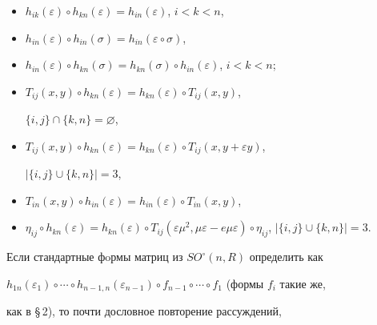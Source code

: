 \begin{itemize} 


\item[$\bold 1$. a)] $h_{ik}(\varepsilon)\circ 


h_{kn}(\varepsilon)=h_{in}(\varepsilon)$, $i<k<n$, 


\item[\phantom{$\bold 1$.} b)] $h_{in}(\varepsilon)\circ 


h_{in}(\sigma)=h_{in}(\varepsilon\circ\sigma)$, 


\item[\phantom{$\bold 1$.} c)] $h_{in}(\varepsilon)\circ 


h_{kn}(\sigma)=h_{kn}(\sigma)\circ h_{in}(\varepsilon)$, $i<k<n$; 


%


\item[$\bold 2$. a)] $T_{ij}(x,y)\circ 


h_{kn}(\varepsilon)=h_{kn}(\varepsilon)\circ T_{ij}(x,y)$, 


$\{i,j\}\cap\{k,n\}=\varnothing$, 


\item[\phantom{$\bold 1$.} b)] $T_{ij}(x,y)\circ h_{kn}(\varepsilon)= 


h_{kn}(\varepsilon)\circ T_{ij}(x,y+\varepsilon y)$, 


$|\{i,j\}\cup\{k,n\}|=3$, 


\item[\phantom{$\bold 1$.} c)] $T_{in}(x,y)\circ h_{in}(\varepsilon)= 


h_{in}(\varepsilon)\circ T_{in}(x,y)$, 


\item[\phantom{$\bold 1$.} d)] $\eta_{ij}\circ h_{kn}(\varepsilon)= 


h_{kn}(\varepsilon)\circ T_{ij}(\varepsilon\mu^2,\mu\varepsilon- 


e\mu\varepsilon)\circ\eta_{ij}$, $|\{i,j\}\cup\{k,n\}|=3$. 


\end{itemize} 


 


Если стандартные фoрмы матриц из $SO^\circ(n,R)$ определить как 


$h_{1n}(\varepsilon_1)\circ\dotsb\circ h_{n-1,n}(\varepsilon_{n-1}) 


\circ f_{n-1}\circ\dotsb\circ f_1$ (формы $f_i$ такие же, 


как в \S\,2), то почти дословное повторение рассуждений, 


